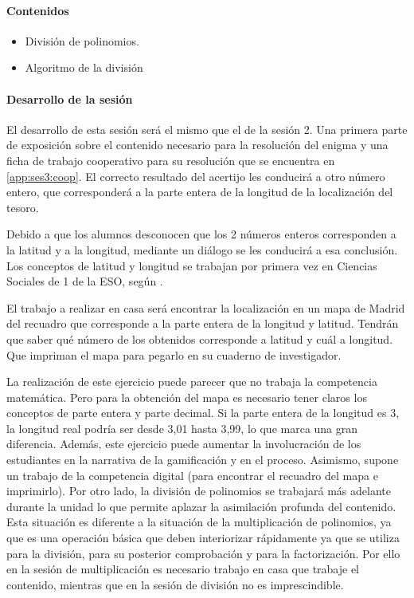 \paragraph{Contenidos}
\begin{itemize}
	\item División de polinomios.
	\item Algoritmo de la división
\end{itemize}

\paragraph{Desarrollo de la sesión}

El desarrollo de esta sesión será el mismo que el de la sesión 2.
%
Una primera parte de exposición sobre el contenido necesario para la resolución del enigma y una ficha de trabajo cooperativo para su resolución que se encuentra en \ref{app:ses3:coop}.
%
El correcto resultado del acertijo les conducirá a otro número entero, que corresponderá a la parte entera de la longitud de la localización del tesoro.

Debido a que los alumnos desconocen que los 2 números enteros corresponden a la latitud y a la longitud, mediante un diálogo se les conducirá a esa conclusión.
%
Los conceptos de latitud y longitud se trabajan por primera vez en Ciencias Sociales de 1 de la ESO, según \bocm.


El trabajo a realizar en casa será encontrar la localización en un mapa de Madrid del recuadro que corresponde a la parte entera de la longitud y latitud.
%
Tendrán que saber qué número de los obtenidos corresponde a latitud y cuál a longitud.
%
Que impriman el mapa para pegarlo en su cuaderno de investigador.

\Justificacion{}
%
La realización de este ejercicio puede parecer que no trabaja la competencia matemática. 
%
Pero para la obtención del mapa es necesario tener claros los conceptos de parte entera y parte decimal.
%
Si la parte entera de la longitud es 3, la longitud real podría ser desde 3,01 hasta 3,99, lo que marca una gran diferencia.
%
Además, este ejercicio puede aumentar la involucración de los estudiantes en la narrativa de la gamificación y en el proceso.
%
Asimismo, supone un trabajo de la competencia digital (para encontrar el recuadro del mapa e imprimirlo).
%
Por otro lado, la división de polinomios se trabajará más adelante durante la unidad lo que permite aplazar la asimilación profunda del contenido.
%
Esta situación es diferente a la situación de la multiplicación de polinomios, ya que es una operación básica que deben interiorizar rápidamente ya que se utiliza para la división, para su posterior comprobación y para la factorización.
%
Por ello en la sesión de multiplicación es necesario trabajo en casa que trabaje el contenido, mientras que en la sesión de división no es imprescindible.



